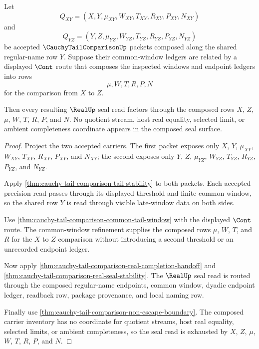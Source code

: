 \begin{theorem}
\label{thm:cauchy-tail-comparison-window-composition-seal-exhaustion}
Let
$$
Q_{XY}=(X,Y,\mu_{XY},W_{XY},T_{XY},R_{XY},P_{XY},N_{XY})
$$
and
$$
Q_{YZ}=(Y,Z,\mu_{YZ},W_{YZ},T_{YZ},R_{YZ},P_{YZ},N_{YZ})
$$
be accepted $\CauchyTailComparisonUp$ packets composed along the shared regular-name row $Y$. Suppose their common-window ledgers are related by a displayed $\Cont$ route that composes the inspected windows and endpoint ledgers into rows
$$
\mu,W,T,R,P,N
$$
for the comparison from $X$ to $Z$.

Then every resulting $\RealUp$ seal read factors through the composed rows $X$, $Z$, $\mu$, $W$, $T$, $R$, $P$, and $N$. No quotient stream, host real equality, selected limit, or ambient completeness coordinate appears in the composed seal surface.
\end{theorem}
\begin{proof}
Project the two accepted carriers. The first packet exposes only $X$, $Y$, $\mu_{XY}$, $W_{XY}$, $T_{XY}$, $R_{XY}$, $P_{XY}$, and $N_{XY}$; the second exposes only $Y$, $Z$, $\mu_{YZ}$, $W_{YZ}$, $T_{YZ}$, $R_{YZ}$, $P_{YZ}$, and $N_{YZ}$.

Apply \autoref{thm:cauchy-tail-comparison-tail-stability} to both packets. Each accepted precision read passes through its displayed threshold and finite common window, so the shared row $Y$ is read through visible late-window data on both sides.

Use \autoref{thm:cauchy-tail-comparison-common-tail-window} with the displayed $\Cont$ route. The common-window refinement supplies the composed rows $\mu$, $W$, $T$, and $R$ for the $X$ to $Z$ comparison without introducing a second threshold or an unrecorded endpoint ledger.

Now apply \autoref{thm:cauchy-tail-comparison-real-completion-handoff} and \autoref{thm:cauchy-tail-comparison-real-seal-stability}. The $\RealUp$ seal read is routed through the composed regular-name endpoints, common window, dyadic endpoint ledger, readback row, package provenance, and local naming row.

Finally use \autoref{thm:cauchy-tail-comparison-non-escape-boundary}. The composed carrier inventory has no coordinate for quotient streams, host real equality, selected limits, or ambient completeness, so the seal read is exhausted by $X$, $Z$, $\mu$, $W$, $T$, $R$, $P$, and $N$.
\end{proof}

